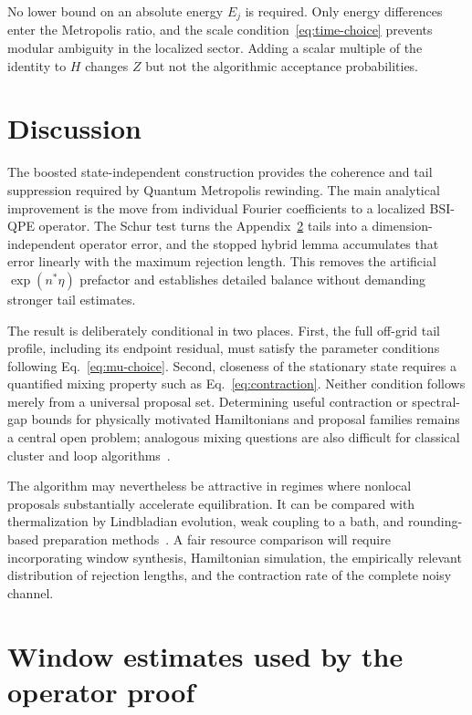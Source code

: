 \documentclass[aps,floatfix,10pt,amssymb,amsmath,superscriptaddress,nofootinbib,longbibliography,nobalancelastpage,twocolumn]{revtex4-2}
\begin{document}
No lower bound on an absolute energy $E_j$ is required.  Only energy differences enter the Metropolis ratio, and the scale condition~\eqref{eq:time-choice} prevents modular ambiguity in the localized sector.  Adding a scalar multiple of the identity to $H$ changes $Z$ but not the algorithmic acceptance probabilities.

\section{Discussion}

The boosted state-independent construction provides the coherence and tail suppression required by Quantum Metropolis rewinding.  The main analytical improvement is the move from individual Fourier coefficients to a localized BSI-QPE operator.  The Schur test turns the Appendix~\ref{app:windows} tails into a dimension-independent operator error, and the stopped hybrid lemma accumulates that error linearly with the maximum rejection length.  This removes the artificial $\exp(n^*\eta)$ prefactor and establishes detailed balance without demanding stronger tail estimates.

The result is deliberately conditional in two places.  First, the full off-grid tail profile, including its endpoint residual, must satisfy the parameter conditions following Eq.~\eqref{eq:mu-choice}.  Second, closeness of the stationary state requires a quantified mixing property such as Eq.~\eqref{eq:contraction}.  Neither condition follows merely from a universal proposal set.  Determining useful contraction or spectral-gap bounds for physically motivated Hamiltonians and proposal families remains a central open problem; analogous mixing questions are also difficult for classical cluster and loop algorithms~\cite{todo2019parallel,luijten2006introduction}.

The algorithm may nevertheless be attractive in regimes where nonlocal proposals substantially accelerate equilibration.  It can be compared with thermalization by Lindbladian evolution, weak coupling to a bath, and rounding-based preparation methods~\cite{chen2023quantumthermalstatepreparation,rall2023thermal,chen2021fast,shtanko2021preparing}.  A fair resource comparison will require incorporating window synthesis, Hamiltonian simulation, the empirically relevant distribution of rejection lengths, and the contraction rate of the complete noisy channel.

\appendix
\onecolumngrid

\section{Window estimates used by the operator proof}
\label{app:windows}
\end{document}
